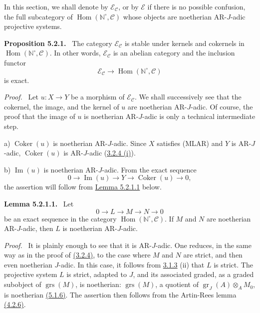 \documentclass[11pt]{article}
\newenvironment{statement}[1]{\par\medskip\noindent\textbf{#1.}\ }{\par\medskip}
\newenvironment{prooftext}[1][Proof]{\par\noindent\emph{#1.}\ }{\par\medskip}
\DeclareMathOperator{\Hom}{Hom}
\providecommand{\Coker}{\operatorname{Coker}}
\providecommand{\gr}{\operatorname{gr}}
\providecommand{\Hom}{\operatorname{Hom}}
\providecommand{\Im}{\operatorname{Im}}
\providecommand{\Coker}{\operatorname{Coker}}
\providecommand{\gr}{\operatorname{gr}}
\renewcommand{\Im}{\operatorname{Im}}
\providecommand{\gr}{\operatorname{gr}}
\providecommand{\grs}{\operatorname{grs}}
\providecommand{\Coker}{\operatorname{Coker}}
\providecommand{\Im}{\operatorname{Im}}
\providecommand{\Hom}{\operatorname{Hom}}
\begin{document}
In this section, we shall denote by \(\mathcal E_{\mathcal C}\), or by \(\mathcal E\) if there is no possible confusion, the full subcategory of \(\Hom(\mathbb N^\circ,\mathcal C)\) whose objects are noetherian AR-\(J\)-adic projective systems.

\label{sga5:V:proposition:5.2.1}\begin{statement}{Proposition 5.2.1}
The category \(\mathcal E_{\mathcal C}\) is stable under kernels and cokernels in \(\Hom(\mathbb N^\circ,\mathcal C)\). In other words, \(\mathcal E_{\mathcal C}\) is an abelian category and the inclusion functor
\[
\mathcal E_{\mathcal C}\longrightarrow \Hom(\mathbb N^\circ,\mathcal C)
\]
is exact.
\end{statement}

\begin{prooftext}
Let \(u:X\to Y\) be a morphism of \(\mathcal E_{\mathcal C}\). We shall successively see that the cokernel, the image, and the kernel of \(u\) are noetherian AR-\(J\)-adic. Of course, the proof that the image of \(u\) is noetherian AR-\(J\)-adic is only a technical intermediate step.

a) \(\Coker(u)\) is noetherian AR-\(J\)-adic. Since \(X\) satisfies (MLAR) and \(Y\) is AR-\(J\)-adic, \(\Coker(u)\) is AR-\(J\)-adic (\hyperref[sga5:V:proposition:3.2.4]{3.2.4 (i)}).

b) \(\Im(u)\) is noetherian AR-\(J\)-adic. From the exact sequence
\[
0\longrightarrow \Im(u)\longrightarrow Y\longrightarrow \Coker(u)\longrightarrow 0,
\]
the assertion will follow from \hyperref[sga5:V:lemma:5.2.1.1]{Lemma 5.2.1.1} below.
\end{prooftext}

\label{sga5:V:lemma:5.2.1.1}\begin{statement}{Lemma 5.2.1.1}
Let
\[
0\longrightarrow L\longrightarrow M\longrightarrow N\longrightarrow0
\]
be an exact sequence in the category \(\Hom(\mathbb N^\circ,\mathcal C)\). If \(M\) and \(N\) are noetherian AR-\(J\)-adic, then \(L\) is noetherian AR-\(J\)-adic.
\end{statement}

\begin{prooftext}
It is plainly enough to see that it is AR-\(J\)-adic. One reduces, in the same way as in the proof of \hyperref[sga5:V:proposition:3.2.4]{(3.2.4)}, to the case where \(M\) and \(N\) are strict, and then even noetherian \(J\)-adic. In this case, it follows from \hyperref[sga5:V:proposition:3.1.3]{3.1.3} (ii) that \(L\) is strict. The projective system \(L\) is strict, adapted to \(J\), and its associated graded, as a graded subobject of \(\grs(M)\), is noetherian: \(\grs(M)\), a quotient of \(\gr_J(A)\otimes_A M_0\), is noetherian \hyperref[sga5:V:proposition:5.1.6]{(5.1.6)}. The assertion then follows from the Artin-Rees lemma \hyperref[sga5:V:theorem:4.2.6]{(4.2.6)}.
\end{prooftext}
\end{document}
